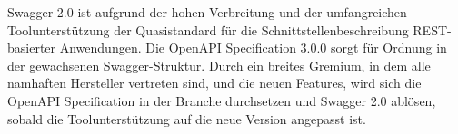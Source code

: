 
Swagger 2.0 ist aufgrund der hohen Verbreitung und der umfangreichen Toolunterstützung der Quasistandard für die Schnittstellenbeschreibung REST-basierter Anwendungen. Die OpenAPI Specification 3.0.0 sorgt für Ordnung in der gewachsenen Swagger-Struktur. Durch ein breites Gremium, in dem alle namhaften Hersteller vertreten sind, und die neuen Features, wird sich die OpenAPI Specification in der Branche durchsetzen und Swagger 2.0 ablösen, sobald die Toolunterstützung auf die neue Version angepasst ist.

